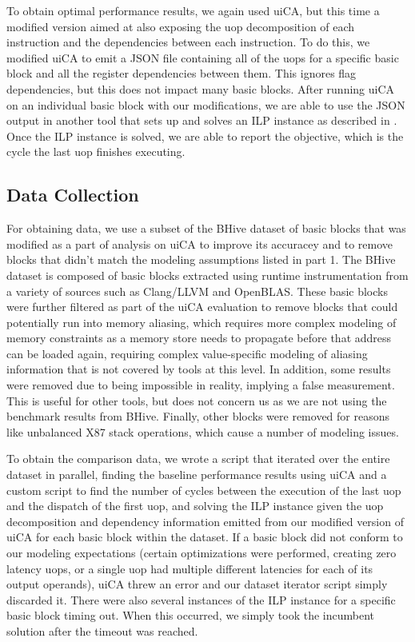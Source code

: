 \documentclass[sigconf]{acmart}
\begin{document}
To obtain optimal performance results, we again used uiCA, but this time a modified version aimed at also
exposing the uop decomposition of each instruction and the dependencies between each instruction. To do this,
we modified uiCA to emit a JSON file containing all of the uops for a specific basic block and all the register
dependencies between them. This ignores flag dependencies, but this does not impact many basic blocks. After
running uiCA on an individual basic block with our modifications, we are able to use the JSON output in another
tool that sets up and solves an ILP instance as described in \label{sec:ilp-formulation}. Once the ILP instance
is solved, we are able to report the objective, which is the cycle the last uop finishes executing.


\subsection{Data Collection}

For obtaining data, we use a subset of the BHive \cite{chen2019bhive} dataset of basic blocks that was modified as
a part of analysis on uiCA \cite{abel2022uica} to improve its accuracey and to remove blocks that didn't match
the modeling assumptions listed in part 1. The BHive dataset is composed of basic blocks extracted using runtime
instrumentation from a variety of sources such as Clang/LLVM and OpenBLAS. These basic blocks were further filtered
as part of the uiCA evaluation to remove blocks that could potentially run into memory aliasing, which requires
more complex modeling of memory constraints as a memory store needs to propagate before that address can be
loaded again, requiring complex value-specific modeling of aliasing information that is not covered by tools at this
level. In addition, some results were removed due to being impossible in reality, implying a false measurement. This
is useful for other tools, but does not concern us as we are not using the benchmark results from BHive. Finally,
other blocks were removed for reasons like unbalanced X87 stack operations, which cause a number of modeling issues.

To obtain the comparison data, we wrote a script that iterated over the entire dataset in parallel, finding the baseline
performance results using uiCA and a custom script to find the number of cycles between the execution of the last uop
and the dispatch of the first uop, and solving the ILP instance given the uop decomposition and dependency information
emitted from our modified version of uiCA for each basic block within the dataset. If a basic block did not conform to
our modeling expectations (certain optimizations were performed, creating zero latency uops, or a single uop had multiple
different latencies for each of its output operands), uiCA threw an error and our dataset iterator script simply
discarded it. There were also several instances of the ILP instance for a specific basic block timing out. When this
occurred, we simply took the incumbent solution after the timeout was reached.
\end{document}
